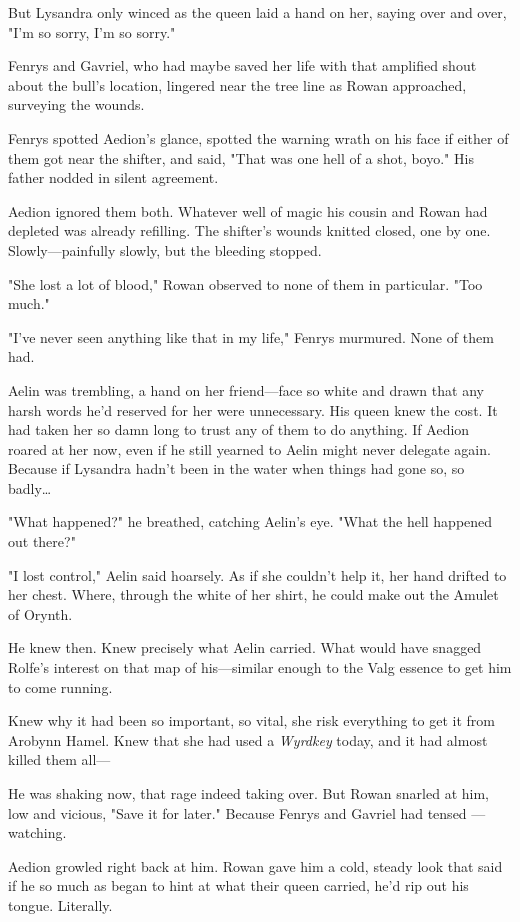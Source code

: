 But Lysandra only winced as the queen laid a hand on her, saying over and over, "I'm so sorry, I'm so sorry."

Fenrys and Gavriel, who had maybe saved her life with that amplified shout about the bull's location, lingered near the tree line as Rowan approached, surveying the wounds.

Fenrys spotted Aedion's glance, spotted the warning wrath on his face if either of them got near the shifter, and said, "That was one hell of a shot, boyo." His father nodded in silent agreement.

Aedion ignored them both. Whatever well of magic his cousin and Rowan had depleted was already refilling. The shifter's wounds knitted closed, one by one. Slowly---painfully slowly, but  the bleeding stopped.

"She lost a lot of blood," Rowan observed to none of them in particular. "Too much."

"I've never seen anything like that in my life," Fenrys murmured. None of them had.

Aelin was trembling, a hand on her friend---face so white and drawn that any harsh words he'd reserved for her were unnecessary. His queen knew the cost. It had taken her so damn long to trust any of them to do anything. If Aedion roared at her now, even if he still yearned to
 Aelin might never delegate again. Because if Lysandra hadn't been in the water when things had gone so, so badly\ldots{}

"What happened?" he breathed, catching Aelin's eye. "What the hell happened out there?"

"I lost control," Aelin said hoarsely. As if she couldn't help it, her hand drifted to her chest. Where, through the white of her shirt, he could make out the Amulet of Orynth.

He knew then. Knew precisely what Aelin carried. What would have snagged Rolfe's interest on that map of his---similar enough to the Valg essence to get him to come running.

Knew why it had been so important, so vital, she risk everything to get it from Arobynn Hamel. Knew that she had used a \emph{Wyrdkey} today, and it had almost killed them all---

He was shaking now, that rage indeed taking over. But Rowan snarled at him, low and vicious, "Save it for later." Because Fenrys and Gavriel had tensed ---watching.

Aedion growled right back at him. Rowan gave him a cold, steady look that said if he so much as began to hint at what their queen carried, he'd rip out his tongue. Literally.

